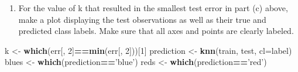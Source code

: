 \documentclass[]{article}
\newenvironment{Shaded}{\begin{snugshade}}{\end{snugshade}}
\newcommand{\DataTypeTok}[1]{\textcolor[rgb]{0.13,0.29,0.53}{#1}}
\newcommand{\DecValTok}[1]{\textcolor[rgb]{0.00,0.00,0.81}{#1}}
\newcommand{\KeywordTok}[1]{\textcolor[rgb]{0.13,0.29,0.53}{\textbf{#1}}}
\newcommand{\NormalTok}[1]{#1}
\newcommand{\OperatorTok}[1]{\textcolor[rgb]{0.81,0.36,0.00}{\textbf{#1}}}
\newcommand{\StringTok}[1]{\textcolor[rgb]{0.31,0.60,0.02}{#1}}
\providecommand{\tightlist}{%
  \setlength{\itemsep}{0pt}\setlength{\parskip}{0pt}}
\begin{document}
\begin{enumerate}
\def\labelenumi{(\alph{enumi})}
\setcounter{enumi}{3}
\tightlist
\item
  For the value of k that resulted in the smallest test error in part
  (c) above, make a plot displaying the test observations as well as
  their true and predicted class labels. Make sure that all axes and
  points are clearly labeled.
\end{enumerate}

\begin{Shaded}
\begin{Highlighting}[]
\NormalTok{k <-}\StringTok{ }\KeywordTok{which}\NormalTok{(err[, }\DecValTok{2}\NormalTok{]}\OperatorTok{==}\KeywordTok{min}\NormalTok{(err[, }\DecValTok{2}\NormalTok{]))[}\DecValTok{1}\NormalTok{]}
\NormalTok{prediction <-}\StringTok{ }\KeywordTok{knn}\NormalTok{(train, test, }\DataTypeTok{cl=}\NormalTok{label)}
\NormalTok{blues <-}\StringTok{ }\KeywordTok{which}\NormalTok{(prediction}\OperatorTok{==}\StringTok{'blue'}\NormalTok{)}
\NormalTok{reds <-}\StringTok{ }\KeywordTok{which}\NormalTok{(prediction}\OperatorTok{==}\StringTok{'red'}\NormalTok{)}


\end{Highlighting}
\end{Shaded}
\end{document}
